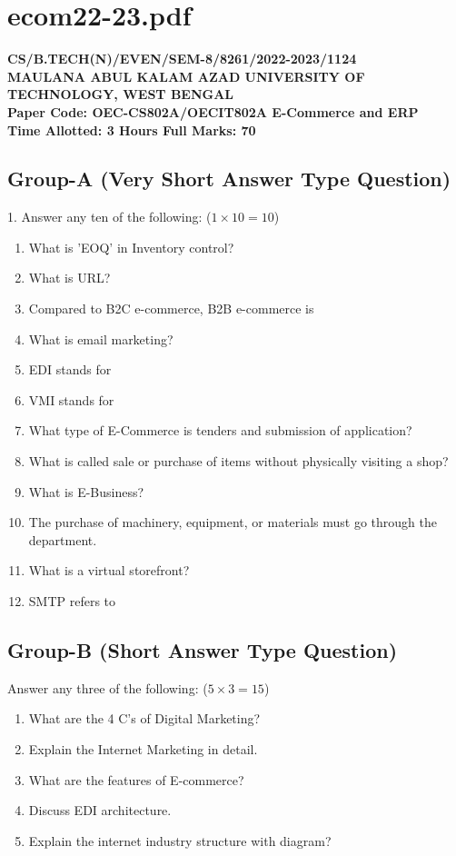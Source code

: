 \documentclass{article}
\begin{document}
\section*{ecom22-23.pdf}
\textbf{CS/B.TECH(N)/EVEN/SEM-8/8261/2022-2023/1124} \\
\textbf{MAULANA ABUL KALAM AZAD UNIVERSITY OF TECHNOLOGY, WEST BENGAL} \\
\textbf{Paper Code: OEC-CS802A/OECIT802A \hfill E-Commerce and ERP} \\
\textbf{Time Allotted: 3 Hours \hfill Full Marks: 70}

\subsection*{Group-A (Very Short Answer Type Question)}
1. Answer any ten of the following: ($1 \times 10 = 10$)
\begin{enumerate}
    \item[(I)] What is 'EOQ' in Inventory control?
    \item[(II)] What is URL?
    \item[(III)] Compared to B2C e-commerce, B2B e-commerce is \underline{\hspace{2cm}}
    \item[(IV)] What is email marketing?
    \item[(V)] EDI stands for \underline{\hspace{2cm}}
    \item[(VI)] VMI stands for \underline{\hspace{2cm}}
    \item[(VII)] What type of E-Commerce is tenders and submission of application?
    \item[(VIII)] What is called sale or purchase of items without physically visiting a shop?
    \item[(IX)] What is E-Business?
    \item[(X)] The purchase of machinery, equipment, or materials must go through the \underline{\hspace{2cm}} department.
    \item[(XI)] What is a virtual storefront?
    \item[(XII)] SMTP refers to \underline{\hspace{2cm}}
\end{enumerate}

\subsection*{Group-B (Short Answer Type Question)}
Answer any three of the following: ($5 \times 3 = 15$)
\begin{enumerate}
    \item[2.] What are the 4 C's of Digital Marketing?
    \item[3.] Explain the Internet Marketing in detail.
    \item[4.] What are the features of E-commerce?
    \item[5.] Discuss EDI architecture.
    \item[6.] Explain the internet industry structure with diagram?
\end{enumerate}
\end{document}
